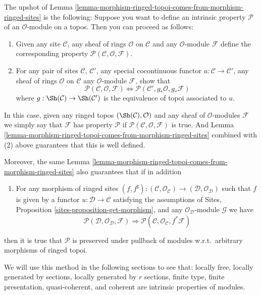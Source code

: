 \medskip\noindent
The upshot of
Lemma \ref{lemma-morphism-ringed-topoi-comes-from-morphism-ringed-sites}
is the following: Suppose you want to define
an intrinsic property $\mathcal{P}$ of an $\mathcal{O}$-module on a
topos. Then you can proceed as follows:
\begin{enumerate}
\item Given any site $\mathcal{C}$, any sheaf of rings $\mathcal{O}$
on $\mathcal{C}$ and any $\mathcal{O}$-module $\mathcal{F}$
define the corresponding
property $\mathcal{P}(\mathcal{C}, \mathcal{O}, \mathcal{F})$.
\item For any pair of sites $\mathcal{C}$, $\mathcal{C}'$, any
special cocontinuous functor $u : \mathcal{C} \to \mathcal{C}'$,
any sheaf of rings $\mathcal{O}$ on $\mathcal{C}$ any
$\mathcal{O}$-module $\mathcal{F}$, show that
$$
\mathcal{P}(\mathcal{C}, \mathcal{O}, \mathcal{F})
\Leftrightarrow
\mathcal{P}(\mathcal{C}', g_*\mathcal{O}, g_*\mathcal{F})
$$
where $g : \Sh(\mathcal{C}) \to \Sh(\mathcal{C}')$
is the equivalence of topoi associated to $u$.
\end{enumerate}
In this case, given any ringed topos $(\Sh(\mathcal{C}), \mathcal{O})$
and any sheaf of $\mathcal{O}$-modules $\mathcal{F}$ we simply say that
$\mathcal{F}$ has property $\mathcal{P}$ if
$\mathcal{P}(\mathcal{C}, \mathcal{O}, \mathcal{F})$ is true.
And Lemma \ref{lemma-morphism-ringed-topoi-comes-from-morphism-ringed-sites}
combined with (2) above guarantees that this is well defined.

\medskip\noindent
Moreover, the same
Lemma \ref{lemma-morphism-ringed-topoi-comes-from-morphism-ringed-sites}
also guarantees that if in addition
\begin{enumerate}
\item[(3)] For any morphism of ringed sites
$(f, f^\sharp) :
(\mathcal{C}, \mathcal{O}_\mathcal{C})
\to
(\mathcal{D}, \mathcal{O}_\mathcal{D})$
such that $f$ is given by a functor
$u : \mathcal{D} \to \mathcal{C}$ satisfying the
assumptions of Sites, Proposition \ref{sites-proposition-get-morphism},
and any $\mathcal{O}_\mathcal{D}$-module $\mathcal{G}$
we have
$$
\mathcal{P}(\mathcal{D}, \mathcal{O}_\mathcal{D}, \mathcal{F})
\Rightarrow
\mathcal{P}(\mathcal{C}, \mathcal{O}_\mathcal{C}, f^*\mathcal{F})
$$
\end{enumerate}
then it is true that $\mathcal{P}$ is preserved under pullback
of modules w.r.t.\ arbitrary morphisms of ringed topoi.

\medskip\noindent
We will use this method in the following sections to see
that:
locally free,
locally generated by sections,
locally generated by $r$ sections,
finite type,
finite presentation,
quasi-coherent, and
coherent
are intrinsic properties of modules.

